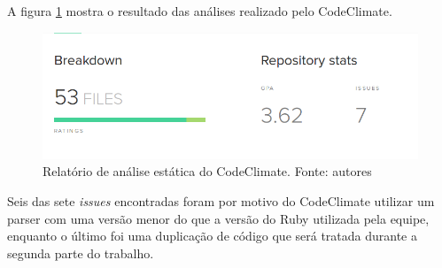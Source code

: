 \begin{anexosenv}
A figura \ref{img:codeclimate} mostra o resultado das análises realizado pelo CodeClimate. 

\begin{figure}[H]
    \centering
    \includegraphics[scale=0.5]{figuras/codeclimate.png}
    \caption[Relatório de análise estática do CodeClimate]{Relatório de análise estática do CodeClimate. Fonte: autores}
    \label{img:codeclimate}
\end{figure}

Seis das sete \textit{issues} encontradas foram por motivo do CodeClimate utilizar um parser com uma versão menor do que a versão do Ruby utilizada pela equipe, enquanto o último foi uma duplicação de código que será tratada durante a segunda parte do trabalho.

\end{anexosenv}
